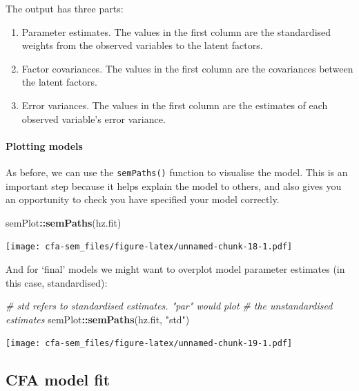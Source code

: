 \documentclass[]{article}
\newenvironment{Shaded}{\begin{snugshade}}{\end{snugshade}}
\newcommand{\CommentTok}[1]{\textcolor[rgb]{0.56,0.35,0.01}{\textit{#1}}}
\newcommand{\KeywordTok}[1]{\textcolor[rgb]{0.13,0.29,0.53}{\textbf{#1}}}
\newcommand{\NormalTok}[1]{#1}
\newcommand{\OperatorTok}[1]{\textcolor[rgb]{0.81,0.36,0.00}{\textbf{#1}}}
\newcommand{\StringTok}[1]{\textcolor[rgb]{0.31,0.60,0.02}{#1}}
\let\oldparagraph\paragraph
\renewcommand{\paragraph}[1]{\oldparagraph{#1}\mbox{}}
\begin{document}
The output has three parts:

\begin{enumerate}
\def\labelenumi{\arabic{enumi}.}
\item
  Parameter estimates. The values in the first column are the standardised
  weights from the observed variables to the latent factors.
\item
  Factor covariances. The values in the first column are the covariances
  between the latent factors.
\item
  Error variances. The values in the first column are the estimates of each
  observed variable's error variance.
\end{enumerate}

\hypertarget{plotting-models}{%
\paragraph{Plotting models}\label{plotting-models}}

As before, we can use the \texttt{semPaths()} function to visualise the model. This is
an important step because it helps explain the model to others, and also gives
you an opportunity to check you have specified your model correctly.

\begin{Shaded}
\begin{Highlighting}[]
\NormalTok{semPlot}\OperatorTok{::}\KeywordTok{semPaths}\NormalTok{(hz.fit)}
\end{Highlighting}
\end{Shaded}

\texttt{[image: cfa-sem\_files/figure-latex/unnamed-chunk-18-1.pdf]}

And for `final' models we might want to overplot model parameter estimates (in
this case, standardised):

\begin{Shaded}
\begin{Highlighting}[]
\CommentTok{# std refers to standardised estimates. "par" would plot}
\CommentTok{# the unstandardised estimates}
\NormalTok{semPlot}\OperatorTok{::}\KeywordTok{semPaths}\NormalTok{(hz.fit, }\StringTok{"std"}\NormalTok{)}
\end{Highlighting}
\end{Shaded}

\texttt{[image: cfa-sem\_files/figure-latex/unnamed-chunk-19-1.pdf]}

\hypertarget{model-fit}{%
\subsection*{CFA model fit}\label{model-fit}}
\end{document}
